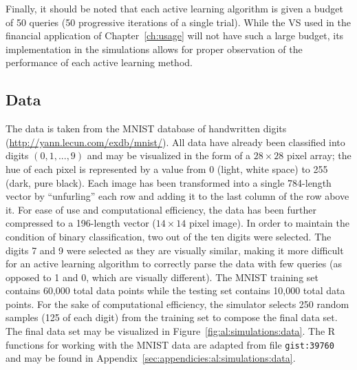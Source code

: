 \noindent Finally, it should be noted that each active learning algorithm is 
given a budget of 50 queries (50 progressive iterations of a single trial). 
While the VS used in the financial application of Chapter~\ref{ch:usage} will 
not have such a large budget, its implementation in the simulations allows 
for proper observation of the performance of each active learning method.

\subsection{Data}
\label{sec:al:simulation:data}
The data is taken from the MNIST database of handwritten digits 
(\url{http://yann.lecun.com/exdb/mnist/}). All data have already been 
classified into digits $(0,1,...,9)$ and may be visualized in the form of a 
$28\times 28$ pixel array; the hue of each pixel is represented by a value from 
0 (light, white space) to 255 (dark, pure black). 
Each image has been transformed into a single 784-length vector by 
``unfurling'' each row and adding it to the last column of the row above it. 
For ease of use and computational efficiency, the data has been 
further compressed to a 196-length vector ($14\times 14$ pixel image). In order 
to maintain the condition of binary classification, two out of the ten digits 
were selected. The digits 7 and 9 were selected as they are visually similar, 
making it more difficult for an active learning algorithm to correctly parse 
the data with few queries (as opposed to 1 and 0, which are visually 
different). The MNIST training set contains 60,000 total data points 
while the testing set contains 10,000 total data points. For the sake of 
computational efficiency, the simulator selects 250 random samples (125 of each 
digit) from the training set to compose the final data set. 
The final data set may be visualized in Figure~\ref{fig:al:simulations:data}. 
The R functions for working with the MNIST data are adapted from file 
\texttt{gist:39760}~\cite{oconnor2008} and may be found in 
Appendix~\ref{sec:appendicies:al:simulations:data}.

